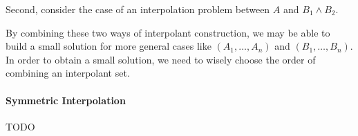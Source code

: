 Second, consider the case of an interpolation problem between $A$ and
$B_1 \wedge B_2$.

By combining these two ways of interpolant construction, we may be
able to build a small solution for more general cases like $(A_1,
\ldots, A_n)$ and $(B_1, \ldots, B_n)$.  In order to obtain a small
solution, we need to wisely choose the order of combining an
interpolant set.

\paragraph{Symmetric Interpolation}
TODO
